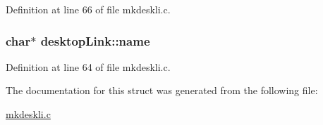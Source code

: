 Definition at line 66 of file mkdeskli.\-c.

\hypertarget{structdesktopLink_a2c2c14251c17686085db6497406d2e14}{
\subsubsection[{name}]{\setlength{\rightskip}{0pt plus 5cm}char$\ast$ desktop\-Link\-::name}}\label{structdesktopLink_a2c2c14251c17686085db6497406d2e14}


Definition at line 64 of file mkdeskli.\-c.



The documentation for this struct was generated from the following file\-:\begin{DoxyCompactItemize}
\item 
\hyperlink{mkdeskli_8c}{mkdeskli.\-c}\end{DoxyCompactItemize}
